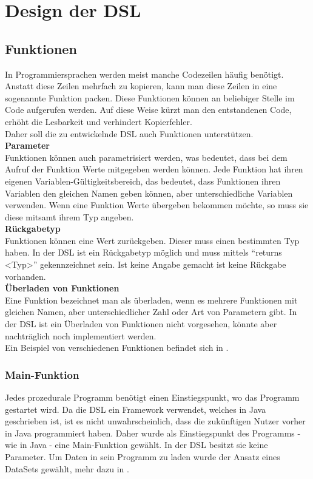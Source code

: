 
\chapter{Design der DSL}

\section{Funktionen}
In Programmiersprachen werden meist manche Codezeilen häufig benötigt.
Anstatt diese Zeilen mehrfach zu kopieren, kann man diese Zeilen in eine sogenannte Funktion packen.
Diese Funktionen können an beliebiger Stelle im Code aufgerufen werden.
Auf diese Weise kürzt man den entstandenen Code, erhöht die Lesbarkeit und verhindert Kopierfehler.\\
Daher soll die zu entwickelnde \ac{DSL} auch Funktionen unterstützen.\\
\textbf{Parameter}\\
Funktionen können auch parametrisiert werden, was bedeutet, dass bei dem Aufruf der Funktion Werte mitgegeben werden können.
Jede Funktion hat ihren eigenen Variablen-Gültigkeitsbereich, das bedeutet, dass Funktionen ihren Variablen den gleichen Namen geben können, aber unterschiedliche Variablen verwenden.
Wenn eine Funktion Werte übergeben bekommen möchte, so muss sie diese mitsamt ihrem Typ angeben.\\
\textbf{Rückgabetyp}\\
Funktionen können eine Wert zurückgeben.
Dieser muss einen bestimmten Typ haben.
In der DSL ist ein Rückgabetyp möglich und muss mittels ``returns <Typ>'' gekennzeichnet sein.
Ist keine Angabe gemacht ist keine Rückgabe vorhanden.\\
\textbf{Überladen von Funktionen}\\
Eine Funktion bezeichnet man als überladen, wenn es mehrere Funktionen mit gleichen Namen, aber unterschiedlicher Zahl oder Art von Parametern gibt.
In der DSL ist ein Überladen von Funktionen nicht vorgesehen, könnte aber nachträglich noch implementiert werden.\\
Ein Beispiel von verschiedenen Funktionen befindet sich in .\\

\subsection{Main-Funktion}
Jedes prozedurale Programm benötigt einen Einstiegspunkt, wo das Programm gestartet wird.
Da die DSL ein Framework verwendet, welches in Java geschrieben ist, ist es nicht unwahrscheinlich, dass die zukünftigen Nutzer vorher in Java programmiert haben.
Daher wurde als Einstiegspunkt des Programms - wie in Java - eine Main-Funktion gewählt.
In der DSL besitzt sie keine Parameter.
Um Daten in sein Programm zu laden wurde der Ansatz eines DataSets gewählt, mehr dazu in .

